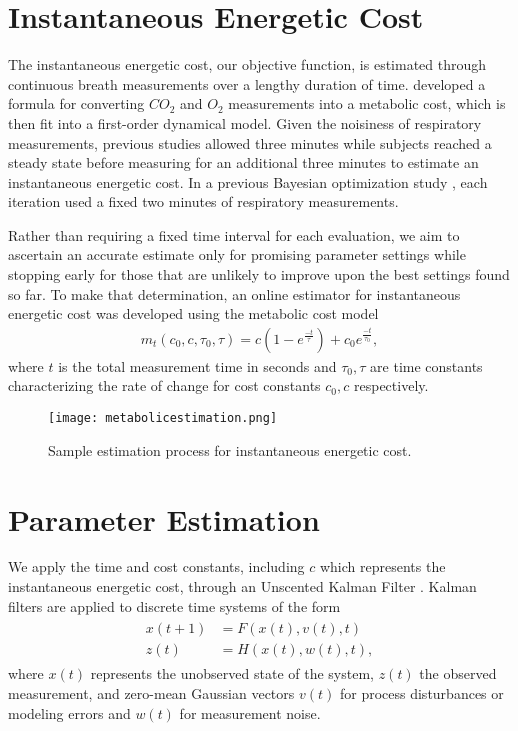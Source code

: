 \section{Instantaneous Energetic Cost}
The instantaneous energetic cost, our objective function, is estimated through continuous breath measurements over a lengthy duration of time. \citet{Brockway1987} developed a formula for converting $CO_2$ and $O_2$ measurements into a metabolic cost, which is then fit into a first-order dynamical model. Given the noisiness of respiratory measurements, previous studies \citep{Felt2015,Selinger2014} allowed three minutes while subjects reached a steady state before measuring for an additional three minutes to estimate an instantaneous energetic cost. In a previous Bayesian optimization study \citep{Ding2018}, each iteration used a fixed two minutes of respiratory measurements. 

Rather than requiring a fixed time interval for each evaluation, we aim to ascertain an accurate estimate only for promising parameter settings while stopping early for those that are unlikely to improve upon the best settings found so far. To make that determination, an online estimator for instantaneous energetic cost was developed using the metabolic cost model
\begin{align}
m_t(c_0, c, \tau_0, \tau) = c(1-e^{\frac{-t}{\tau}}) + c_0e^{\frac{-t}{\tau_0}},
\end{align}
where $t$ is the total measurement time in seconds and $\tau_0, \tau$ are time constants characterizing the rate of change for cost constants $c_0, c$ respectively.

\begin{figure}[t]
\centering
\texttt{[image: metabolicestimation.png]}
\caption{Sample estimation process for instantaneous energetic cost.}
\label{fig:metabolicestimation}
\end{figure}

\section{Parameter Estimation}
We apply the time and cost constants, including $c$ which represents the instantaneous energetic cost, through an Unscented Kalman Filter \citep{julier1997}. Kalman filters are applied to discrete time systems of the form
\begin{align}\begin{split}
  x(t+1) &= F(x(t), v(t), t)\\
  z(t) &= H(x(t), w(t), t),
\end{split}\end{align}
where $x(t)$ represents the unobserved state of the system, $z(t)$ the observed measurement, and zero-mean Gaussian vectors $v(t)$ for process disturbances or modeling errors and $w(t)$ for measurement noise. 

